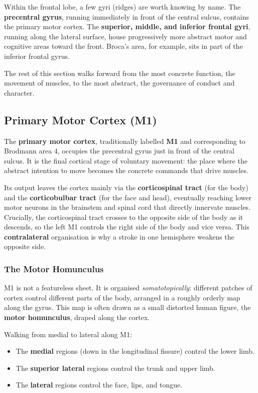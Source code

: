 \documentclass[11pt]{article}
\begin{document}
Within the frontal lobe, a few gyri (ridges) are worth knowing by name. The \textbf{precentral gyrus}, running immediately in front of the central sulcus, contains the primary motor cortex. The \textbf{superior, middle, and inferior frontal gyri}, running along the lateral surface, house progressively more abstract motor and cognitive areas toward the front. Broca's area, for example, sits in part of the inferior frontal gyrus.

The rest of this section walks forward from the most concrete function, the movement of muscles, to the most abstract, the governance of conduct and character.

\subsection{Primary Motor Cortex (M1)}

The \textbf{primary motor cortex}, traditionally labelled \textbf{M1} and corresponding to Brodmann area 4, occupies the precentral gyrus just in front of the central sulcus. It is the final cortical stage of voluntary movement: the place where the abstract intention to move becomes the concrete commands that drive muscles.

Its output leaves the cortex mainly via the \textbf{corticospinal tract} (for the body) and the \textbf{corticobulbar tract} (for the face and head), eventually reaching lower motor neurons in the brainstem and spinal cord that directly innervate muscles. Crucially, the corticospinal tract crosses to the opposite side of the body as it descends, so the left M1 controls the right side of the body and vice versa. This \textbf{contralateral} organisation is why a stroke in one hemisphere weakens the opposite side.

\subsubsection{The Motor Homunculus}

M1 is not a featureless sheet. It is organised \textit{somatotopically}: different patches of cortex control different parts of the body, arranged in a roughly orderly map along the gyrus. This map is often drawn as a small distorted human figure, the \textbf{motor homunculus}, draped along the cortex.

Walking from medial to lateral along M1:

\begin{itemize}
    \item The \textbf{medial} regions (down in the longitudinal fissure) control the lower limb.
    \item The \textbf{superior lateral} regions control the trunk and upper limb.
    \item The \textbf{lateral} regions control the face, lips, and tongue.
\end{itemize}
\end{document}
